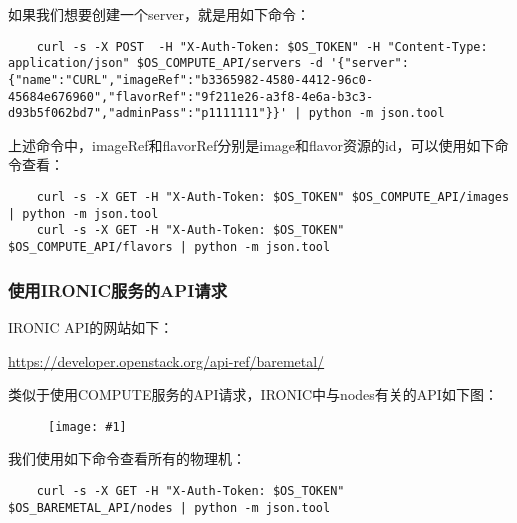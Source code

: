 \documentclass[a4paper,left=1.5cm,right=1.5cm,11pt]{article}
\newcommand{\fic}[1]{\begin{figure}[H]
		\center
		\texttt{[image: \#1]}
	\end{figure}}
\begin{document}
	如果我们想要创建一个server，就是用如下命令：
	\begin{lstlisting}
	curl -s -X POST  -H "X-Auth-Token: $OS_TOKEN" -H "Content-Type: application/json" $OS_COMPUTE_API/servers -d '{"server":{"name":"CURL","imageRef":"b3365982-4580-4412-96c0-45684e676960","flavorRef":"9f211e26-a3f8-4e6a-b3c3-d93b5f062bd7","adminPass":"p1111111"}}' | python -m json.tool
	\end{lstlisting}

	上述命令中，imageRef和flavorRef分别是image和flavor资源的id，可以使用如下命令查看：
	\begin{lstlisting}
	curl -s -X GET -H "X-Auth-Token: $OS_TOKEN" $OS_COMPUTE_API/images | python -m json.tool
	curl -s -X GET -H "X-Auth-Token: $OS_TOKEN" $OS_COMPUTE_API/flavors | python -m json.tool
	\end{lstlisting}

\subsubsection{使用IRONIC服务的API请求}
	IRONIC API的网站如下：\par
	\url{https://developer.openstack.org/api-ref/baremetal/}

	类似于使用COMPUTE服务的API请求，IRONIC中与nodes有关的API如下图：
	\fic{2.png}

	我们使用如下命令查看所有的物理机：
	\begin{lstlisting}
	curl -s -X GET -H "X-Auth-Token: $OS_TOKEN" $OS_BAREMETAL_API/nodes | python -m json.tool
	\end{lstlisting}
\end{document}
